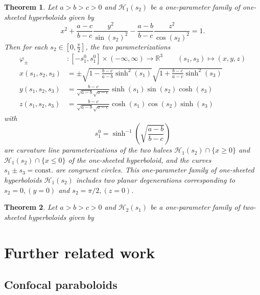 \documentclass[10pt, a4paper]{article}
\theoremstyle{BoldTopSpacing}
\newtheorem{theorem}{Theorem}[section]
\theoremstyle{BoldTopSpacing}
\theoremstyle{BoldTopSpacing}
\theoremstyle{BoldTopBottomSpacing}
\theoremstyle{BoldTopSpacing}
\theoremstyle{BoldTopBottomSpacing}
\theoremstyle{remark}
\begin{document}
\begin{theorem}
\label{thm:isometric-deformation-para-one-hyperboloid}
Let $a > b > c > 0$ and $\mathcal{H}_{1}(s_{2})$ be a one-parameter family of one-sheeted hyperboloids given by
\begin{equation}
x^2 + \frac{a - c}{b - c} \frac{y^2}{\sin(s_{2})^2} -  \frac{a - b}{b - c} \frac{z^2}{ \cos(s_{2})^2} = 1.
\end{equation}
Then for each $s_{2} \in \left[ 0, \frac{\pi}{2} \right]$, the two parameterizations
\begin{align*}
    \varphi_{\pm} &: [-s_{1}^{0}, s_{1}^{0}] \times (-\infty, \infty) \to \mathbb{R}^3 \quad \quad (s_{1}, s_{3}) \mapsto (x, y, z) \\[10pt]
    x(s_{1}, s_{2}, s_{3}) &= \pm \sqrt{1 - \frac{b - c}{a - b} \sinh^2(s_{1})} \sqrt{1 + \frac{b - c}{a - c}\sinh^2(s_{3})} \\[10pt]
    y(s_{1}, s_{2}, s_{3}) &= \frac{b - c}{\sqrt{a - b} \sqrt{a - c}} \sinh(s_{1}) \sin(s_{2})\cosh(s_{3}) \\[10pt]
    z(s_{1}, s_{2}, s_{3}) &= \frac{b - c}{\sqrt{a - b} \sqrt{a - c}}  \cosh(s_{1}) \cos(s_{2}) \sinh(s_{3})
\end{align*}
with
\[
    s_{1}^{0} = \sinh^{-1}\left( \sqrt{ \frac{a - b}{b - c} } \right)
\]
are curvature line parameterizations of the two halves $\mathcal{H}_{1}(s_{2}) \cap \{ x \geq 0\}$ and $\mathcal{H}_{1}(s_{2}) \cap \{ x \leq 0\}$ of the one-sheeted hyperboloid, and the curves $s_{1} \pm s_{3} = \text{const.}$ are congruent circles. \newline
This one-parameter family of one-sheeted hyperboloids $\mathcal{H}_{1}(s_{2})$ includes two planar degenerations corresponding to $s_{2} = 0,\left(y = 0 \right)$ and $s_{2} = \pi/2, \left( z = 0 \right)$.
\end{theorem}

\begin{theorem}
\label{thm:isometric-deformation-para-two-hyperboloid}
Let $a > b > c > 0$ and $\mathcal{H}_{2}(s_{1})$ be a one-parameter family of two-sheeted hyperboloids given by
\end{theorem}
\section{Further related work}
\label{sec:further-related-work}
\subsection{Confocal paraboloids}
\label{subsec:confocal-paraboloids}
\end{document}
